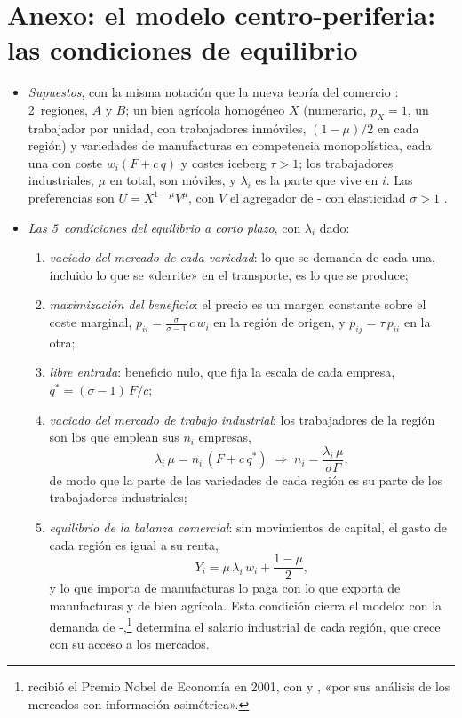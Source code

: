 \documentclass[11pt]{article}
\begin{document}
\section{Anexo: el modelo centro-periferia:\cortetitulo{} las condiciones de equilibrio}\label{anexo:centro-periferia}

\begin{itemize}
\item \emph{Supuestos}\nocite{Krugman1991Increasing}, con la misma notación que la nueva teoría del comercio : 2~regiones, $A$ y $B$; un bien agrícola homogéneo $X$ (numerario, $p_X=1$, un trabajador por unidad, con trabajadores inmóviles, $(1-\mu)/2$ en cada región) y variedades de manufacturas en competencia monopolística, cada una con coste $w_i(F+c\,q)$ y costes iceberg $\tau>1$; los trabajadores industriales, $\mu$ en total, son móviles, y $\lambda_i$ es la parte que vive en $i$. Las preferencias son $U=X^{1-\mu}V^{\mu}$, con $V$ el agregador de - con elasticidad $\sigma>1$ .
\item \emph{Las 5~condiciones del equilibrio a corto plazo}, con $\lambda_i$ dado:
  \begin{enumerate}
  \item \emph{vaciado del mercado de cada variedad}: lo que se demanda de cada una, incluido lo que se «derrite» en el transporte, es lo que se produce;
  \item \emph{maximización del beneficio}: el precio es un margen constante sobre el coste marginal, $p_{ii}=\frac{\sigma}{\sigma-1}\,c\,w_i$ en la región de origen, y $p_{ij}=\tau\,p_{ii}$ en la otra;
  \item \emph{libre entrada}: beneficio nulo, que fija la escala de cada empresa, $q^*=(\sigma-1)\,F/c$;
  \item \emph{vaciado del mercado de trabajo industrial}: los trabajadores de la región son los que emplean sus $n_i$ empresas,
    \[
    \lambda_i\,\mu=n_i\,(F+c\,q^*)\;\Longrightarrow\;n_i=\frac{\lambda_i\,\mu}{\sigma F},
    \]
    de modo que la parte de las variedades de cada región es su parte de los trabajadores industriales;
  \item \emph{equilibrio de la balanza comercial}: sin movimientos de capital, el gasto de cada región es igual a su renta,
    \[
    Y_i=\mu\,\lambda_i\,w_i+\frac{1-\mu}{2},
    \]
    y lo que importa de manufacturas lo paga con lo que exporta de manufacturas y de bien agrícola. Esta condición cierra el modelo: con la demanda de -,\footnote{ recibió el Premio Nobel de Economía en 2001, con  y , «por sus análisis de los mercados con información asimétrica»\nocite{Nobel2001AkerlofSpenceStiglitz}.} determina el salario industrial de cada región, que crece con su acceso a los mercados.

\end{enumerate}
\end{itemize}
\end{document}
